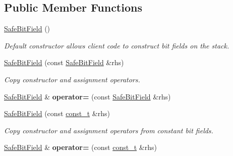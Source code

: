 \subsection*{Public Member Functions}
\begin{DoxyCompactItemize}
\item 
\hypertarget{classLoki_1_1SafeBitField_a6eede7024bdf0cec80283046eee71657}{}\hyperlink{classLoki_1_1SafeBitField_a6eede7024bdf0cec80283046eee71657}{Safe\+Bit\+Field} ()\label{classLoki_1_1SafeBitField_a6eede7024bdf0cec80283046eee71657}

\begin{DoxyCompactList}\small\item\em Default constructor allows client code to construct bit fields on the stack. \end{DoxyCompactList}\item 
\hypertarget{classLoki_1_1SafeBitField_ac6bcedb450f23cfec66101161e65ec96}{}\hyperlink{classLoki_1_1SafeBitField_ac6bcedb450f23cfec66101161e65ec96}{Safe\+Bit\+Field} (const \hyperlink{classLoki_1_1SafeBitField}{Safe\+Bit\+Field} \&rhs)\label{classLoki_1_1SafeBitField_ac6bcedb450f23cfec66101161e65ec96}

\begin{DoxyCompactList}\small\item\em Copy constructor and assignment operators. \end{DoxyCompactList}\item 
\hypertarget{classLoki_1_1SafeBitField_a8e78cb7e80e10a8ff15825f4dcc330bd}{}\hyperlink{classLoki_1_1SafeBitField}{Safe\+Bit\+Field} \& {\bfseries operator=} (const \hyperlink{classLoki_1_1SafeBitField}{Safe\+Bit\+Field} \&rhs)\label{classLoki_1_1SafeBitField_a8e78cb7e80e10a8ff15825f4dcc330bd}

\item 
\hypertarget{classLoki_1_1SafeBitField_a7cd8f882c46d5e018e88657817a90487}{}\hyperlink{classLoki_1_1SafeBitField_a7cd8f882c46d5e018e88657817a90487}{Safe\+Bit\+Field} (const \hyperlink{classLoki_1_1SafeBitField_aa8ac2761b53243b4648a61263ef91665}{const\+\_\+t} \&rhs)\label{classLoki_1_1SafeBitField_a7cd8f882c46d5e018e88657817a90487}

\begin{DoxyCompactList}\small\item\em Copy constructor and assignment operators from constant bit fields. \end{DoxyCompactList}\item 
\hypertarget{classLoki_1_1SafeBitField_ae83395c37ef47f52f0b0a834fadd6fed}{}\hyperlink{classLoki_1_1SafeBitField}{Safe\+Bit\+Field} \& {\bfseries operator=} (const \hyperlink{classLoki_1_1SafeBitField_aa8ac2761b53243b4648a61263ef91665}{const\+\_\+t} \&rhs)\label{classLoki_1_1SafeBitField_ae83395c37ef47f52f0b0a834fadd6fed}


\end{DoxyCompactItemize}
